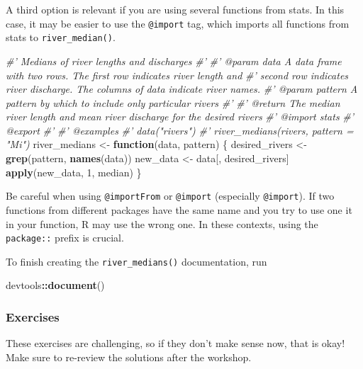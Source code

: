 \documentclass[
]{book}
\newenvironment{Shaded}{\begin{snugshade}}{\end{snugshade}}
\newcommand{\CommentTok}[1]{\textcolor[rgb]{0.56,0.35,0.01}{\textit{#1}}}
\newcommand{\ControlFlowTok}[1]{\textcolor[rgb]{0.13,0.29,0.53}{\textbf{#1}}}
\newcommand{\DecValTok}[1]{\textcolor[rgb]{0.00,0.00,0.81}{#1}}
\newcommand{\KeywordTok}[1]{\textcolor[rgb]{0.13,0.29,0.53}{\textbf{#1}}}
\newcommand{\NormalTok}[1]{#1}
\newcommand{\OperatorTok}[1]{\textcolor[rgb]{0.81,0.36,0.00}{\textbf{#1}}}
\newcommand{\StringTok}[1]{\textcolor[rgb]{0.31,0.60,0.02}{#1}}
\begin{document}
A third option is relevant if you are using several functions from stats. In this case, it may be easier to use the \texttt{@import} tag, which imports all functions from stats to \texttt{river\_median()}.

\begin{Shaded}
\begin{Highlighting}[]
\CommentTok{#' Medians of river lengths and discharges}
\CommentTok{#'}
\CommentTok{#' @param data A data frame with two rows. The first row indicates river length and}
\CommentTok{#'   second row indicates river discharge. The columns of data indicate river names.}
\CommentTok{#' @param pattern A pattern by which to include only particular rivers}
\CommentTok{#'}
\CommentTok{#' @return The median river length and mean river discharge for the desired rivers}
\CommentTok{#' @import stats}
\CommentTok{#' @export}
\CommentTok{#'}
\CommentTok{#' @examples}
\CommentTok{#' data("rivers")}
\CommentTok{#' river_medians(rivers, pattern = "Mi")}
\NormalTok{river_medians <-}\StringTok{ }\ControlFlowTok{function}\NormalTok{(data, pattern) \{}
\NormalTok{  desired_rivers <-}\StringTok{ }\KeywordTok{grep}\NormalTok{(pattern, }\KeywordTok{names}\NormalTok{(data))}
\NormalTok{  new_data <-}\StringTok{ }\NormalTok{data[, desired_rivers]}
  \KeywordTok{apply}\NormalTok{(new_data, }\DecValTok{1}\NormalTok{, median)}
\NormalTok{\}}
\end{Highlighting}
\end{Shaded}

Be careful when using \texttt{@importFrom} or \texttt{@import} (especially \texttt{@import}). If two functions from different packages have the same name and you try to use one it in your function, R may use the wrong one. In these contexts, using the \texttt{package::} prefix is crucial.

To finish creating the \texttt{river\_medians()} documentation, run

\begin{Shaded}
\begin{Highlighting}[]
\NormalTok{devtools}\OperatorTok{::}\KeywordTok{document}\NormalTok{()}
\end{Highlighting}
\end{Shaded}

\hypertarget{ex-set3}{%
\subsubsection{Exercises}\label{ex-set3}}

These exercises are challenging, so if they don't make sense now, that is okay! Make sure to re-review the solutions after the workshop.
\end{document}
